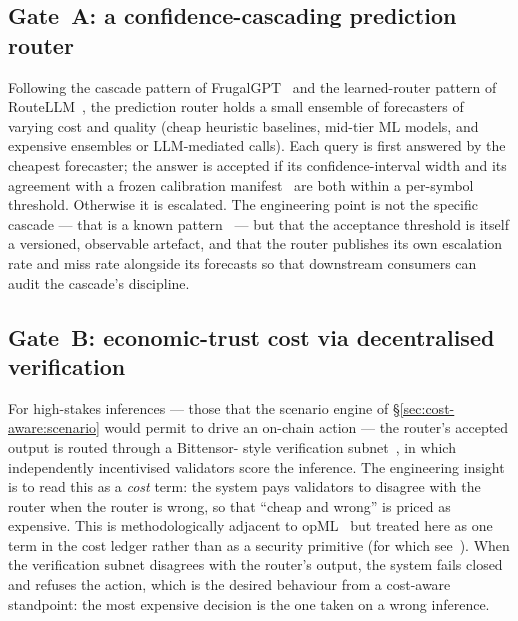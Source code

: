 \documentclass[11pt,a4paper]{article}
\begin{document}
\subsection{Gate~A: a confidence-cascading prediction router}\label{sec:cost-aware:cascade}

Following the cascade pattern of FrugalGPT~\cite{chen2023frugalgpt} and
the learned-router pattern of RouteLLM~\cite{ong2024routellm}, the
prediction router holds a small ensemble of forecasters of varying cost
and quality (cheap heuristic baselines, mid-tier ML models, and
expensive ensembles or LLM-mediated calls). Each query is first answered
by the cheapest forecaster; the answer is accepted if its
confidence-interval width and its agreement with a frozen calibration
manifest~\cite{omnirisk2026calibration} are both within a per-symbol
threshold. Otherwise it is escalated. The engineering point is not the
specific cascade --- that is a known
pattern~\cite{chen2023frugalgpt,ong2024routellm} --- but that the
acceptance threshold is itself a versioned, observable artefact, and
that the router publishes its own escalation rate and miss rate alongside
its forecasts so that downstream consumers can audit the cascade's
discipline.

\subsection{Gate~B: economic-trust cost via decentralised
verification}\label{sec:cost-aware:verification}

For high-stakes inferences --- those that the scenario engine of
\S\ref{sec:cost-aware:scenario} would permit to drive an on-chain
action --- the router's accepted output is routed through a Bittensor-
style verification
subnet~\cite{rao2021bittensor,steeves2022incentivizing,opentensor2024yuma,opentensor2024evm,lui2025bittensor},
in which independently incentivised validators score the inference. The
engineering insight is to read this as a \emph{cost} term: the system
pays validators to disagree with the router when the router is wrong, so
that ``cheap and wrong'' is priced as expensive. This is methodologically
adjacent to opML~\cite{conway2024opml,ganescu2024trust} but treated here
as one term in the cost ledger rather than as a security primitive (for
which see~\cite{omnirisk2026defending}). When the verification subnet
disagrees with the router's output, the system fails closed and refuses
the action, which is the desired behaviour from a cost-aware standpoint:
the most expensive decision is the one taken on a wrong inference.
\end{document}
